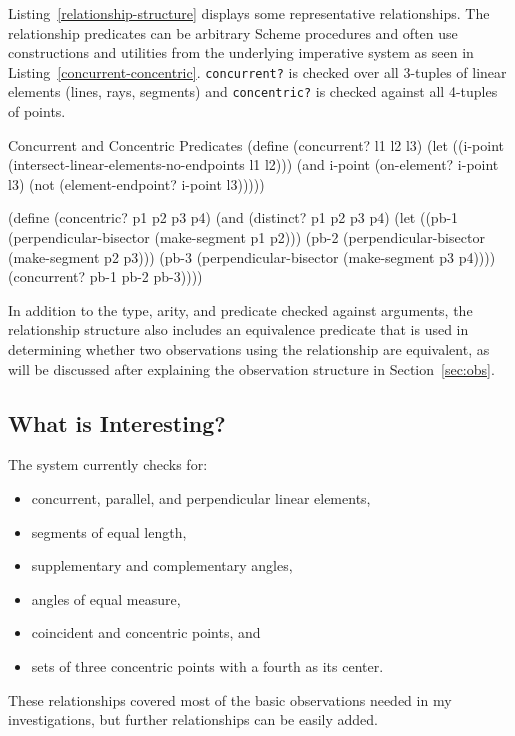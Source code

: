 Listing~\ref{relationship-structure} displays some representative
relationships.  The relationship predicates can be arbitrary Scheme
procedures and often use constructions and utilities from the
underlying imperative system as seen in
Listing~\ref{concurrent-concentric}.  \texttt{concurrent?} is checked
over all 3-tuples of linear elements (lines, rays, segments) and
\texttt{concentric?} is checked against all 4-tuples of points.

\begin{code-listing}
[label=concurrent-concentric]
{Concurrent and Concentric Predicates}
(define (concurrent? l1 l2 l3)
  (let ((i-point (intersect-linear-elements-no-endpoints l1 l2)))
    (and i-point
         (on-element? i-point l3)
         (not (element-endpoint? i-point l3)))))

(define (concentric? p1 p2 p3 p4)
  (and (distinct? p1 p2 p3 p4)
       (let ((pb-1 (perpendicular-bisector (make-segment p1 p2)))
             (pb-2 (perpendicular-bisector (make-segment p2 p3)))
             (pb-3 (perpendicular-bisector (make-segment p3 p4))))
         (concurrent? pb-1 pb-2 pb-3))))
\end{code-listing}

In addition to the type, arity, and predicate checked against
arguments, the relationship structure also includes an equivalence
predicate that is used in determining whether two observations using
the relationship are equivalent, as will be discussed after explaining
the observation structure in Section~\ref{sec:obs}.

\subsection{What is Interesting?}
The system currently checks for:
\begin{spacing}{0.7}
\begin{itemize}
\item concurrent, parallel, and perpendicular linear elements,
\item segments of equal length,
\item supplementary and complementary angles,
\item angles of equal measure,
\item coincident and concentric points, and
\item sets of three concentric points with a fourth as its center.
\end{itemize}
\end{spacing}
\noindent These relationships covered most of the basic observations needed in
my investigations, but further relationships can be easily added.

